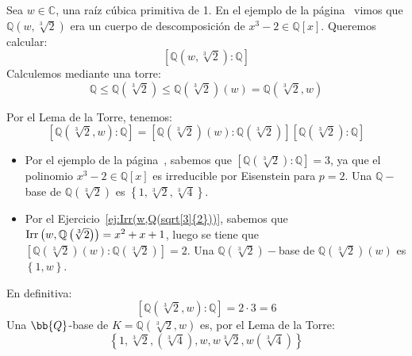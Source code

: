 \begin{ejemplo}\label{ej:Ordenwsqrt3_2}
    Sea $w\in \mathbb{C}$, una raíz cúbica primitiva de 1. En el ejemplo de la página~\pageref{ej:x3menos2CuerpoDescomposicion} vimos que $\mathbb{Q}\left(w,\sqrt[3]{2}\right)$ era un cuerpo de descomposición de $x^3-2\in \mathbb{Q}[x]$. Queremos calcular:
    \begin{equation*}
        \left[\mathbb{Q}\left(w, \sqrt[3]{2}\right):\mathbb{Q}\right]
    \end{equation*}
    Calculemos mediante una torre:
    \begin{equation*}
        \mathbb{Q} \leq \mathbb{Q}\left(\sqrt[3]{2}\right) \leq \mathbb{Q}\left(\sqrt[3]{2}\right)(w) = \mathbb{Q}\left(\sqrt[3]{2}, w\right)
    \end{equation*}

    Por el Lema de la Torre, tenemos:
    \begin{equation*}
        \left[\mathbb{Q}\left(\sqrt[3]{2},w\right):\mathbb{Q}\right] = \left[\mathbb{Q}\left(\sqrt[3]{2}\right)(w) : \mathbb{Q}\left(\sqrt[3]{2}\right)\right]\left[\mathbb{Q}\left(\sqrt[3]{2}\right):\mathbb{Q}\right]
    \end{equation*}

    \begin{itemize}
        \item Por el ejemplo de la página~\pageref{ej:baseQsqrt3_2}, sabemos que $\left[\mathbb{Q}\left(\sqrt[3]{2}\right):\mathbb{Q}\right] = 3$, ya que el polinomio $x^3-2\in \mathbb{Q}[x]$  es irreducible por Eisenstein para $p=2$. Una $\mathbb{Q}-$base de $\mathbb{Q}\left(\sqrt[3]{2}\right)$ es $\left\{1,\sqrt[3]{2},\sqrt[3]{4}\right\}$.
        \item Por el Ejercicio~\ref{ej:Irr(w,Q(sqrt[3]{2}))}, sabemos que $\operatorname{Irr}\left(w,\mathbb{Q}\left(\sqrt[3]{2}\right)\right) = x^2+x+1$, luego se tiene que $\left[\mathbb{Q}\left(\sqrt[3]{2}\right)(w) : \mathbb{Q}\left(\sqrt[3]{2}\right)\right] = 2$. Una $\mathbb{Q}\left(\sqrt[3]{2}\right)-$base de $\mathbb{Q}\left(\sqrt[3]{2}\right)(w)$ es $\left\{1,w\right\}$.
    \end{itemize}
    
    En definitiva:
    \begin{equation*}
        \left[\mathbb{Q}\left(\sqrt[3]{2},w\right):\mathbb{Q}\right] = 2\cdot 3 = 6
    \end{equation*}
    Una $\bb{Q}$-base de $K=\mathbb{Q}\left(\sqrt[3]{2},w\right)$ es, por el Lema de la Torre:
    \begin{equation*}
        \left\{1, \sqrt[3]{2}, \left(\sqrt[3]{4}\right), w, w\sqrt[3]{2}, w\left(\sqrt[3]{4}\right)\right\}
    \end{equation*}
\end{ejemplo}

